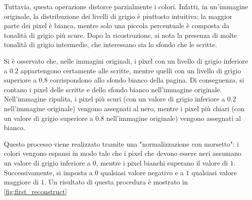     \noindent Tuttavia, questa operazione distorce parzialmente i colori. Infatti, in un'immagine originale, la distribuzione dei livelli di grigio è piuttosto intuitiva: la maggior parte dei pixel è bianca, mentre solo una piccola percentuale è composta da tonalità di grigio più scure. Dopo la ricostruzione, si nota la presenza di molte tonalità di grigio intermedie, che interessano sia lo sfondo che le scritte.

    \noindent Si è osservato che, nelle immagini originali, i pixel con un livello di grigio inferiore a $0.2$ appartengono certamente alle scritte, mentre quelli con un livello di grigio superiore a $0.8$ corrispondono allo sfondo bianco della pagina. Di conseguenza, si contano i pixel delle scritte e dello sfondo bianco nell'immagine originale. Nell'immagine ripulita, i pixel più scuri (con un valore di grigio inferiore a $0.2$ nell'immagine originale) vengono assegnati al nero, mentre i pixel più chiari (con un valore di grigio superiore a $0.8$ nell'immagine originale) vengono assegnati al bianco.

    \noindent Questo processo viene realizzato tramite una "normalizzazione con morsetto": i colori vengono espansi in modo tale che i pixel che devono essere neri assumano un valore di grigio inferiore a $0$, mentre i pixel bianchi superano il valore di $1$. Successivamente, si imposta a $0$ qualsiasi valore negativo e a $1$ qualsiasi valore maggiore di $1$. Un risultato di questa procedura è mostrato in \cref{fig:first_reconstruct}


